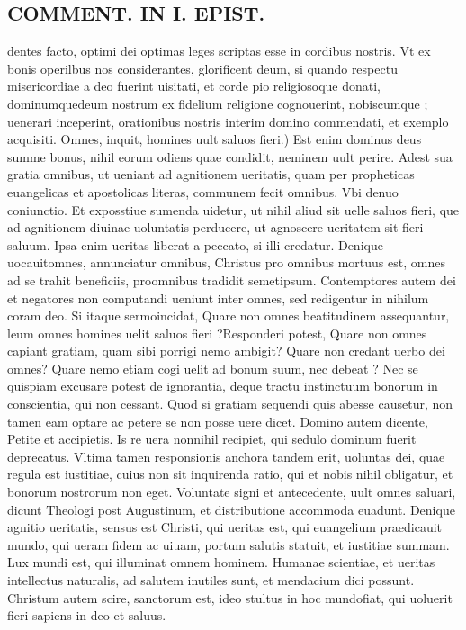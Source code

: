 \documentclass{article}
\begin{document}
\begin{pages}
\section*{COMMENT. IN I. EPIST. }
\marginpar{[ p.482 ]}\pstart dentes facto, optimi dei optimas leges scriptas esse in cordibus nostris. Vt ex bonis operilbus nos considerantes, glorificent deum, si quando respectu misericordiae a deo fuerint uisitati, et corde pio religiosoque  donati, dominumquedeum nostrum ex fidelium religione cognouerint, nobiscumque ; uenerari inceperint, orationibus nostris interim domino commendati, et exemplo acquisiti. Omnes, inquit, homines uult saluos fieri.) Est enim dominus deus summe bonus, nihil eorum odiens quae condidit, neminem uult perire. Adest sua gratia omnibus, ut ueniant ad agnitionem ueritatis, quam per propheticas euangelicas et apostolicas literas, communem fecit omnibus. Vbi denuo coniunctio. Et exposstiue sumenda uidetur, ut nihil aliud sit uelle saluos fieri, que  ad agnitionem diuinae uoluntatis perducere, ut agnoscere ueritatem sit fieri saluum. Ipsa enim ueritas liberat a peccato, si illi credatur. Denique  uocauitomnes, annunciatur omnibus, Christus pro omnibus mortuus est, omnes ad se trahit beneficiis, proomnibus tradidit semetipsum. Contemptores autem dei et negatores non computandi ueniunt inter omnes, sed redigentur in nihilum coram deo. Si itaque sermoincidat, Quare non omnes beatitudinem assequantur, leum omnes homines uelit saluos fieri ?Responderi potest, Quare non omnes capiant gratiam, quam sibi porrigi nemo ambigit? Quare non credant uerbo dei omnes? Quare nemo etiam cogi uelit ad bonum suum, nec debeat ? Nec se quispiam excusare potest de ignorantia, deque  tractu instinctuum bonorum in conscientia, qui non cessant. Quod si gratiam sequendi quis abesse causetur, non tamen eam optare ac petere se non posse uere dicet. Domino autem dicente, Petite et accipietis. Is re uera nonnihil recipiet, qui sedulo dominum fuerit deprecatus. Vltima tamen responsionis anchora tandem erit, uoluntas dei, quae regula est iustitiae, cuius non sit inquirenda ratio, qui et nobis nihil obligatur, et bonorum nostrorum non eget. Voluntate signi et antecedente, uult omnes saluari, dicunt Theologi post Augustinum, et distributione accommoda euadunt. Denique  agnitio ueritatis, sensus est Christi, qui ueritas est, qui euangelium praedicauit mundo, qui ueram fidem ac uiuam, portum salutis statuit, et iustitiae summam. Lux mundi est, qui illuminat omnem hominem. Humanae scientiae, et ueritas intellectus naturalis, ad salutem inutiles sunt, et mendacium dici possunt. Christum autem scire, sanctorum est, ideo stultus in hoc mundofiat, qui uoluerit fieri sapiens in deo et saluus.  \pend
{}
{}

\end{pages}
\end{document}
